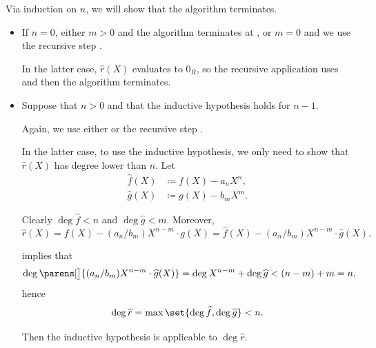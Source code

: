 \begin{defproof}
  Via induction on \( n \), we will show that the algorithm terminates.

  \begin{itemize}
    \item If \( n = 0 \), either \( m > 0 \) and the algorithm terminates at , or \( m = 0 \) and we use the recursive step .

    In the latter case, \( \widehat r(X) \) evaluates to \( 0_R \), so the recursive application uses  and then the algorithm terminates.

    \item Suppose that \( n > 0 \) and that the inductive hypothesis holds for \( n - 1 \).

    Again, we use either  or the recursive step .

    In the latter case, to use the inductive hypothesis, we only need to show that \( \widehat r(X) \) has degree lower than \( n \). Let
    \begin{align*}
      \widehat f(X) &\coloneqq f(X) - a_n X^n, \\
      \widehat g(X) &\coloneqq g(X) - b_m X^m.
    \end{align*}

    Clearly \( \deg \widehat f < n \) and \( \deg \widehat g < m \). Moreover,
    \begin{equation*}
      \widehat r(X)
      =
      f(X) - (a_n / b_m) X^{n-m} \cdot g(X)
      =
      \widehat f(X) - (a_n / b_m) X^{n-m} \cdot \widehat g(X).
    \end{equation*}

     implies that
    \begin{equation*}
      \deg\parens[\big]{ (a_n / b_m) X^{n-m} \cdot \widehat g(X) }
      =
      \deg X^{n - m} + \deg \widehat g
      <
      (n - m) + m
      =
      n,
    \end{equation*}
    hence
    \begin{equation*}
      \deg \widehat r = \max\set{ \deg \widehat f, \deg \widehat g } < n.
    \end{equation*}

    Then the inductive hypothesis is applicable to \( \deg \widehat r \).
  \end{itemize}
\end{defproof}

